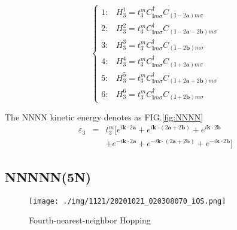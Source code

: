 \documentclass[reprint, aps, prb, showkeys]{revtex4-2}
\begin{document}
\begin{equation}
    \begin{cases}
        1: & H_3^1 = t_3^m C_{\boldsymbol{l}m\sigma}^{\dagger}C_{(\boldsymbol{l}-2\boldsymbol{a})m\sigma}\\
        2: & H_3^2 = t_3^m C_{\boldsymbol{l}m\sigma}^{\dagger}C_{(\boldsymbol{l}-2\boldsymbol{a}-2\boldsymbol{b})m\sigma}\\
        3: & H_3^3 = t_3^m C_{\boldsymbol{l}m\sigma}^{\dagger}C_{(\boldsymbol{l}-2\boldsymbol{b})m\sigma}\\
        4: & H_3^4 = t_3^m C_{\boldsymbol{l}m\sigma}^{\dagger}C_{(\boldsymbol{l}+2\boldsymbol{a})m\sigma}\\
        5: & H_3^5 = t_3^m C_{\boldsymbol{l}m\sigma}^{\dagger}C_{(\boldsymbol{l}+2\boldsymbol{a}+2\boldsymbol{b})m\sigma}\\
        6: & H_3^6 = t_3^m C_{\boldsymbol{l}m\sigma}^{\dagger}C_{(\boldsymbol{l}+2\boldsymbol{b})m\sigma}
    \end{cases} \label{NNNN}
\end{equation}

The NNNN kinetic energy denotes as FIG.\ref{fig:NNNN}
\begin{eqnarray}
    \varepsilon_3 &=& t_3^m[e^{i \boldsymbol{k} \cdot 2\boldsymbol{a}}+e^{i \boldsymbol{k} \cdot (2\boldsymbol{a} + 2\boldsymbol{b})}+e^{i \boldsymbol{k} \cdot 2\boldsymbol{b}} \nonumber \\
    && +e^{-i \boldsymbol{k} \cdot 2\boldsymbol{a}}+e^{-i \boldsymbol{k} \cdot (2\boldsymbol{a} + 2\boldsymbol{b})}+e^{-i \boldsymbol{k} \cdot 2\boldsymbol{b}}] \label{NNNNHopping}
\end{eqnarray}

\subsection{NNNNN(5N)}
\begin{figure}[b]
    \texttt{[image: ./img/1121/20201021\_020308070\_iOS.png]}
    \caption{\label{fig:NNNNN}Fourth-nearest-neighbor Hopping}
\end{figure}
\end{document}
